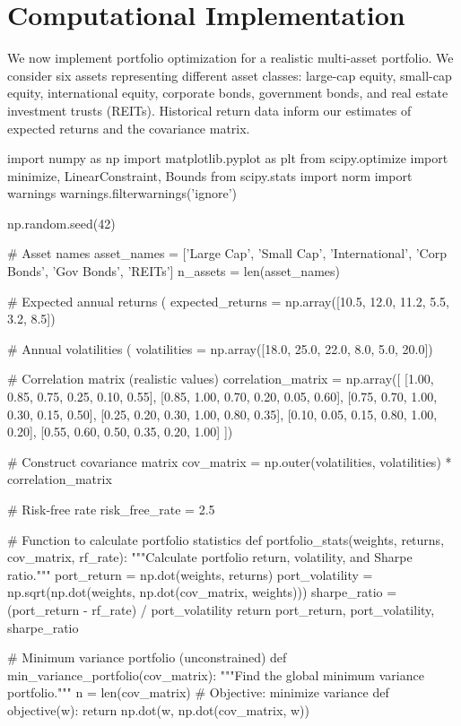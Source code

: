 \documentclass[a4paper, 11pt]{article}
\begin{document}
\section{Computational Implementation}

We now implement portfolio optimization for a realistic multi-asset portfolio. We consider
six assets representing different asset classes: large-cap equity, small-cap equity,
international equity, corporate bonds, government bonds, and real estate investment trusts (REITs).
Historical return data inform our estimates of expected returns and the covariance matrix.

\begin{pycode}
import numpy as np
import matplotlib.pyplot as plt
from scipy.optimize import minimize, LinearConstraint, Bounds
from scipy.stats import norm
import warnings
warnings.filterwarnings('ignore')

np.random.seed(42)

# Asset names
asset_names = ['Large Cap', 'Small Cap', 'International', 'Corp Bonds', 'Gov Bonds', 'REITs']
n_assets = len(asset_names)

# Expected annual returns (%
expected_returns = np.array([10.5, 12.0, 11.2, 5.5, 3.2, 8.5])

# Annual volatilities (%
volatilities = np.array([18.0, 25.0, 22.0, 8.0, 5.0, 20.0])

# Correlation matrix (realistic values)
correlation_matrix = np.array([
    [1.00, 0.85, 0.75, 0.25, 0.10, 0.55],
    [0.85, 1.00, 0.70, 0.20, 0.05, 0.60],
    [0.75, 0.70, 1.00, 0.30, 0.15, 0.50],
    [0.25, 0.20, 0.30, 1.00, 0.80, 0.35],
    [0.10, 0.05, 0.15, 0.80, 1.00, 0.20],
    [0.55, 0.60, 0.50, 0.35, 0.20, 1.00]
])

# Construct covariance matrix
cov_matrix = np.outer(volatilities, volatilities) * correlation_matrix

# Risk-free rate
risk_free_rate = 2.5

# Function to calculate portfolio statistics
def portfolio_stats(weights, returns, cov_matrix, rf_rate):
    """Calculate portfolio return, volatility, and Sharpe ratio."""
    port_return = np.dot(weights, returns)
    port_volatility = np.sqrt(np.dot(weights, np.dot(cov_matrix, weights)))
    sharpe_ratio = (port_return - rf_rate) / port_volatility
    return port_return, port_volatility, sharpe_ratio

# Minimum variance portfolio (unconstrained)
def min_variance_portfolio(cov_matrix):
    """Find the global minimum variance portfolio."""
    n = len(cov_matrix)
    # Objective: minimize variance
    def objective(w):
        return np.dot(w, np.dot(cov_matrix, w))


\end{pycode}
\end{document}
